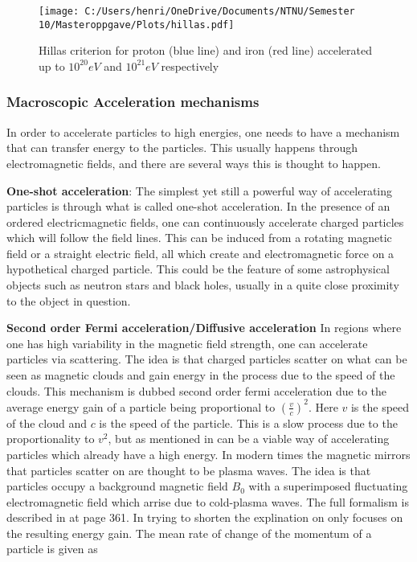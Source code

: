 \begin{figure}
    \centering
    \texttt{[image: C:/Users/henri/OneDrive/Documents/NTNU/Semester 10/Masteroppgave/Plots/hillas.pdf]}
    \caption{Hillas criterion for proton (blue line) and iron (red line) accelerated up to $10^{20}eV$ and $10^{21}eV$ respectively}
    \label{fig:hillas_c}
\end{figure}


\subsubsection{Macroscopic Acceleration mechanisms}
In order to accelerate particles to high energies, one needs to have a mechanism that can transfer energy to the particles. This usually happens through electromagnetic fields, and there are several ways this is thought to happen.

\textbf{One-shot acceleration}:
The simplest yet still a powerful way of accelerating particles is through what is called one-shot acceleration. In the presence of an ordered electricmagnetic fields, one can continuously accelerate charged particles which will follow the field lines. This can be induced from a rotating magnetic field or a straight electric field, all which create and electromagnetic force on a hypothetical charged particle. 
This could be the feature of some astrophysical objects such as neutron stars and black holes, usually in a quite close proximity to the object in question.%


\textbf{Second order Fermi acceleration/Diffusive acceleration}
In regions where one has high variability in the magnetic field strength, one can accelerate particles via scattering. The idea is that charged particles scatter on what can be seen as magnetic clouds and gain energy in the process due to the speed of the clouds. This mechanism is dubbed second order fermi acceleration due to the average energy gain of a particle being proportional to $(\frac{v}{c})^2$. Here $v$ is the speed of the cloud and $c$ is the speed of the particle. This is a slow process due to the proportionality to $v^2$, but as mentioned in \cite{Dermer_2001} can be a viable way of accelerating particles which already have a high energy. In modern times the magnetic mirrors that particles scatter on are thought to be plasma waves. The idea is that particles occupy a background magnetic field $B_0$ with a superimposed fluctuating electromagnetic field which arrise due to cold-plasma waves. The full formalism is described in \cite{BHradiation} at page 361. In trying to shorten the explination on only focuses on the resulting energy gain. The mean rate of change of the momentum of a particle is given as

